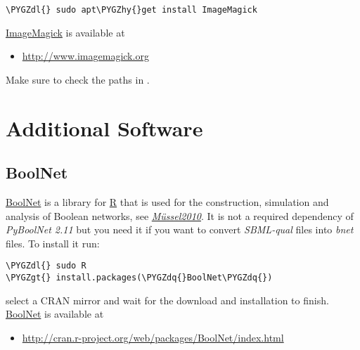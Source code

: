 \documentclass[letterpaper,10pt,english]{sphinxmanual}
\def\PYGZgt{\char`\>}
\def\PYGZdl{\char`\$}
\def\PYGZhy{\char`\-}
\def\PYGZdq{\char`\"}
\begin{document}
\begin{Verbatim}[commandchars=\\\{\}]
\PYGZdl{} sudo apt\PYGZhy{}get install ImageMagick
\end{Verbatim}

\href{http://www.imagemagick.org/script/index.php}{ImageMagick} is available at
\begin{itemize}
\item {} 
\href{http://www.imagemagick.org}{http://www.imagemagick.org}

\end{itemize}

Make sure to check the paths in .


\section{Additional Software}
\label{Installation:additional-software}

\subsection{BoolNet}
\label{Installation:boolnet}\label{Installation:installation-boolnet}
\href{https://cran.r-project.org/web/packages/BoolNet/index.html}{BoolNet} is a library for \href{https://www.r-project.org/}{R} that is used for the construction, simulation and analysis of Boolean networks, see {\hyperref[Bibliography:mussel2010]{\emph{Müssel2010}}}.
It is not a required dependency of \emph{PyBoolNet 2.11} but you need it if you want to convert \emph{SBML-qual} files into \emph{bnet} files.
To install it run:

\begin{Verbatim}[commandchars=\\\{\}]
\PYGZdl{} sudo R
\PYGZgt{} install.packages(\PYGZdq{}BoolNet\PYGZdq{})
\end{Verbatim}

select a CRAN mirror and wait for the download and installation to finish.
\href{https://cran.r-project.org/web/packages/BoolNet/index.html}{BoolNet} is available at
\begin{itemize}
\item {} 
\href{http://cran.r-project.org/web/packages/BoolNet/index.html}{http://cran.r-project.org/web/packages/BoolNet/index.html}

\end{itemize}
\end{document}
